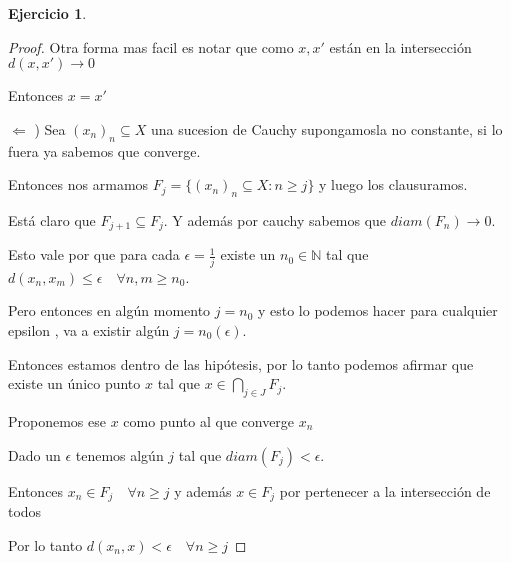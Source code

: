 \documentclass[11pt]{report}
\newcommand{\N}{\mathbb{N}}
\newcommand{\ra}{\rightarrow}
\theoremstyle{definition}
\newtheorem{ej}{Ejercicio}
\begin{document}
\begin{ej}
\begin{proof}
			Otra forma mas facil es notar que como $x,x'$ están en la intersección $d(x,x') \ra 0$

			Entonces $x = x'$

			$\Leftarrow$ ) Sea $(x_n)_n \subseteq X$ una sucesion de Cauchy supongamosla no constante, si lo fuera ya sabemos que converge.

			Entonces nos armamos $F_j = \{(x_n)_n \subseteq X : n \geq j \}$ y luego los clausuramos. 

			Está claro que $F_{j+1} \subseteq F_j$. Y además por cauchy sabemos que $diam(F_n) \ra 0$. 

			Esto vale por que para cada $\epsilon = \frac{1}{j}$ existe un $n_0 \in \N$ tal que $d(x_n,x_m) \leq \epsilon \quad \forall n,m \geq n_0$. 

			Pero entonces en algún momento $j = n_0$ y esto lo podemos hacer para cualquier epsilon , va a existir algún $j = n_0(\epsilon)$.


			Entonces estamos dentro de las hipótesis, por lo tanto podemos afirmar que existe un único punto $x$ tal que $x \in \bigcap_{j \in J} F_j$. 
		
			Proponemos ese $x$ como punto al que converge $x_n$
	
			Dado un $\epsilon$ tenemos algún $j$ tal que $diam(F_j) < \epsilon$.

			Entonces $x_n \in F_j \quad \forall n \geq j$ y además $x\in F_j$ por pertenecer a la intersección de todos

			Por lo tanto $d(x_n,x) < \epsilon \quad \forall n\geq j$
		\end{proof}	
	\end{ej}
\end{document}
